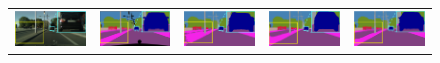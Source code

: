 \documentclass[letterpaper]{article} %
\begin{document}
\begin{figure}[t]
\begin{tabular}{ccccc}
\includegraphics[width=0.19\linewidth]{image/supp/figure6/2a.png}\label{city_2a} &
\hspace{-12pt}
\includegraphics[width=0.19\linewidth]{image/supp/figure6/2b.png}\label{city_2b} &
\hspace{-12pt}
\includegraphics[width=0.19\linewidth]{image/supp/figure6/2c.png}\label{city_2c} &
\hspace{-12pt}
\includegraphics[width=0.19\linewidth]{image/supp/figure6/2d.png}\label{city_2d} &
\hspace{-12pt}
\includegraphics[width=0.19\linewidth]{image/supp/figure6/2e}\label{city_2e} \\


\end{tabular}
\end{figure}
\end{document}
